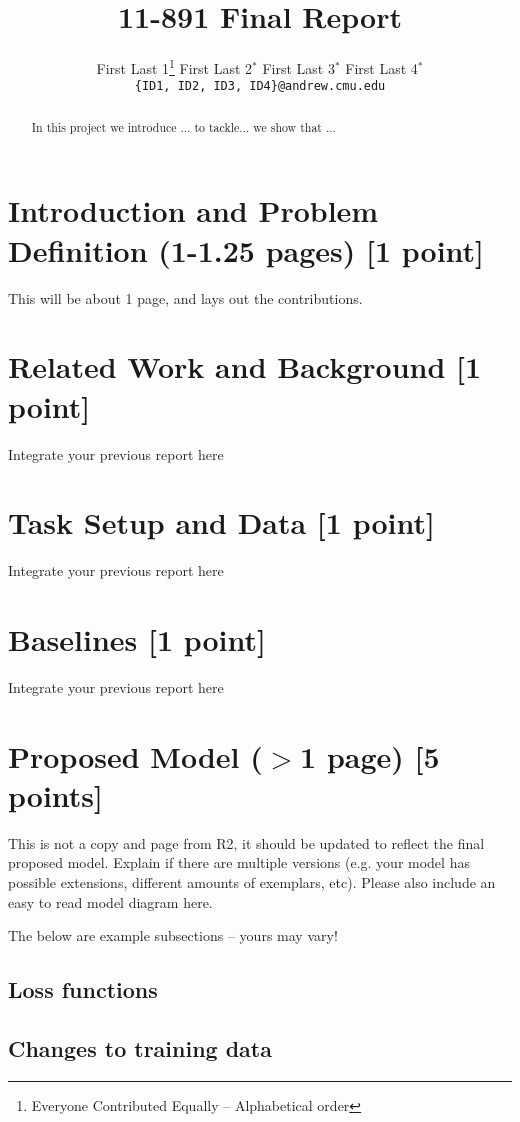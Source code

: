\documentclass[11pt,a4paper]{article}
\title{11-891 Final Report}
\author{
  First Last 1\thanks{\hspace{4pt}Everyone Contributed Equally -- Alphabetical order} \hspace{2em} First Last 2$^*$ \hspace{2em} First Last 3$^*$ \hspace{2em} First Last 4$^*$ \\
  \texttt{\{ID1, ID2, ID3, ID4\}@andrew.cmu.edu}
  }
\date{}
\begin{document}
\maketitle
\begin{abstract}
In this project we introduce ... to tackle... we show that ...
\end{abstract}

\section{Introduction and Problem Definition (1-1.25 pages) [1 point]}
This will be about 1 page, and lays out the contributions.

\clearpage
\section{Related Work and Background [1 point]}
Integrate your previous report here

\clearpage
\section{Task Setup and Data [1 point]}
Integrate your previous report here

\clearpage
\section{Baselines [1 point]}
Integrate your previous report here

\clearpage
\section{Proposed Model ($>$1 page) [5 points]}
This is not a copy and page from R2, it should be updated to reflect the final proposed model. Explain if there are multiple versions (e.g. your model has possible extensions, different amounts of exemplars, etc).  Please also include an easy to read model diagram here.

The below are example subsections -- yours may vary!

\subsection{Loss functions}

\subsection{Changes to training data}
\end{document}
